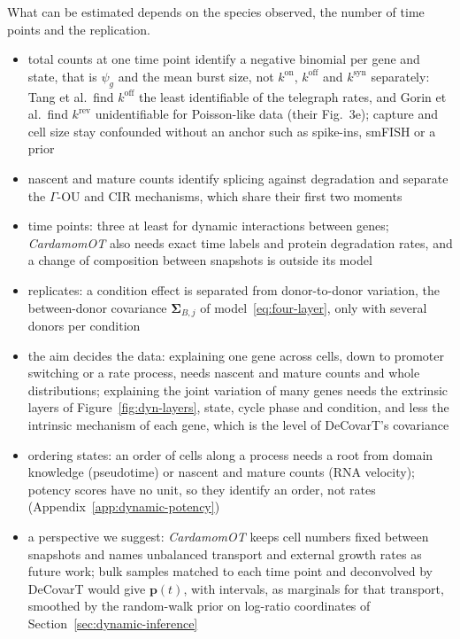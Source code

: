 \begin{remark}[Identifiability]
  \label{rem:dyn-identifiability}
  What can be estimated depends on the species observed, the number of time points and the replication.
  \begin{itemize}
    \item total counts at one time point identify a negative binomial per gene and state, that is \(\psi_{g}\) and
          the mean burst size, not \(k^{\mathrm{on}}\), \(k^{\mathrm{off}}\) and \(k^{\mathrm{syn}}\) separately: Tang et al.\ find \(k^{\mathrm{off}}\) the least
          identifiable of the telegraph rates, and Gorin et al.\ find \(k^{\mathrm{rev}}\) unidentifiable for Poisson-like
          data (their Fig.~3e); capture and cell size stay confounded without an anchor such as spike-ins, smFISH or a
          prior
    \item nascent and mature counts identify splicing against degradation and separate the \(\Gamma\)-OU and CIR mechanisms,
          which share their first two moments
    \item time points: three at least for dynamic interactions between genes; \emph{CardamomOT} also needs exact time
          labels and protein degradation rates, and a change of composition between snapshots is outside its model
    \item replicates: a condition effect is separated from donor-to-donor variation, the between-donor covariance
          \(\boldsymbol{\Sigma}_{B,j}\) of model~\eqref{eq:four-layer}, only with several donors per condition
    \item the aim decides the data: explaining one gene across cells, down to promoter switching or a rate process,
          needs nascent and mature counts and whole distributions; explaining the joint variation of many genes needs
          the extrinsic layers of Figure~\ref{fig:dyn-layers}, state, cycle phase and condition, and less the intrinsic
          mechanism of each gene, which is the level of DeCovarT's covariance
    \item ordering states: an order of cells along a process needs a root from domain knowledge (pseudotime) or nascent
          and mature counts (RNA velocity); potency scores have no unit, so they identify an order, not rates
          (Appendix~\ref{app:dynamic-potency})
  \end{itemize}
\end{remark}

\begin{itemize}
  \item a perspective we suggest: \emph{CardamomOT} keeps cell numbers fixed between snapshots and names unbalanced
        transport and external growth rates as future work; bulk samples matched to each time point and deconvolved
        by DeCovarT would give \(\boldsymbol{p}(t)\), with intervals, as marginals for that transport, smoothed by the
        random-walk prior on log-ratio coordinates of Section~\ref{sec:dynamic-inference}
\end{itemize}

